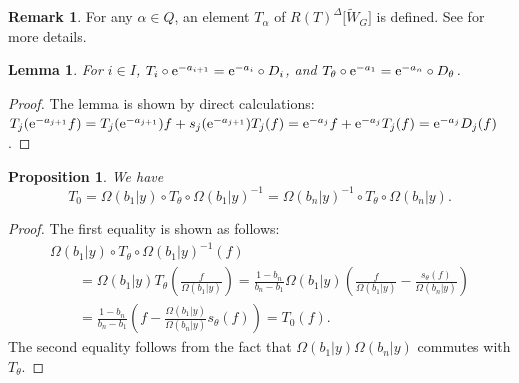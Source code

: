 \documentclass[10pt,a4paper]{amsart}
\numberwithin{equation}{section}
\newcommand{\reg}{\Delta}
\newcommand{\Rep}{{R(T)}}
\newtheorem{Lemma}[Theorem]{Lemma}
\newtheorem{Proposition}[Theorem]{Proposition}
\theoremstyle{definition}
\newtheorem{Remark}[Theorem]{Remark}
\begin{document}
\begin{Remark}
For any $\alpha\in Q$, an element $T_\alpha$ of $\Rep^\reg\big[\tilde{W}_G\big]$ is defined. See \cite[Section~2.2.4]{ISY} for more details.
\end{Remark}





\begin{Lemma}\label{lem:T_and_D}
For $i\in I$,
$T_{i}\circ {\rm e}^{-a_{i+1}}={\rm e}^{-a_{i}}\circ D_{i}$, and
$T_{\theta} \circ {\rm e}^{-a_1}={\rm e}^{-a_n}\circ D_{\theta}$.
\end{Lemma}
\begin{proof}
The lemma is shown by direct calculations:
$T_{j}({\rm e}^{-a_{j+1}}f)=T_{j}({\rm e}^{-a_{j+1}})f+s_{j}({\rm e}^{-a_{j+1}})T_{j}(f)\allowbreak
={\rm e}^{-a_{j}}f+{\rm e}^{-a_{j}}T_{j}(f)={\rm e}^{-a_{j}}D_{j}(f)$.
\end{proof}


\begin{Proposition}\label{prop:T_0}
 We have
 \[
 T_0=\Omega(b_1|y)\circ T_{\theta}\circ \Omega(b_1|y)^{-1}
 =\Omega(b_n|y)^{-1}\circ T_{\theta}\circ \Omega(b_n|y).
 \]
\end{Proposition}
\begin{proof}
The first equality is shown as follows:
\begin{gather*}
\Omega(b_1|y)\circ T_{\theta}\circ \Omega(b_1|y)^{-1}(f)\\
\qquad
=
\Omega(b_1|y)
T_{\theta}\left(
\frac{f}{\Omega(b_1|y)}
\right)
=
\frac{1-b_n}{b_n-b_1}
\Omega(b_1|y)
\left(
\frac{f}{\Omega(b_1|y)}
-
\frac{s_\theta(f)}{\Omega(b_n|y)}
\right)\\
\qquad
=
\frac{1-b_n}{b_n-b_1}
\left(
f
-
\frac{\Omega(b_1|y)}{\Omega(b_n|y)}s_{\theta}(f)
\right)=T_0(f).
\end{gather*}
The second equality follows from the fact that $\Omega(b_1|y)\Omega(b_n|y)$ commutes with $T_{\theta}$.
\end{proof}
\end{document}
